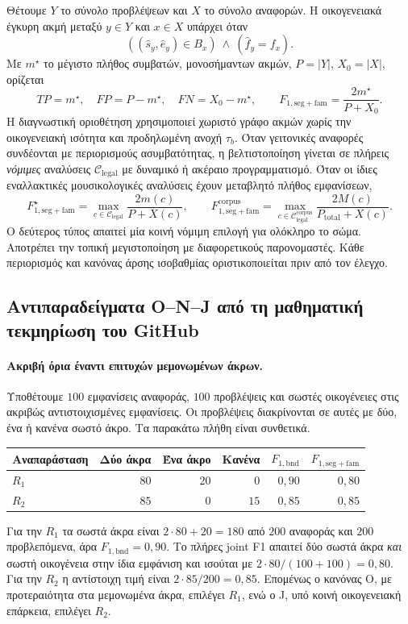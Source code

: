 \documentclass[11pt,a4paper]{article}
\begin{document}
Θέτουμε $Y$ το σύνολο προβλέψεων και $X$ το σύνολο αναφορών. Η οικογενειακά έγκυρη ακμή μεταξύ $y\in Y$ και $x\in X$ υπάρχει όταν
\[
 ((\hat s_y,\hat e_y)\in B_x)\ \land\ (\hat f_y=f_x).
\]
Με $m^\star$ το μέγιστο πλήθος συμβατών, μονοσήμαντων ακμών, $P=|Y|$, $X_0=|X|$, ορίζεται
\[
 TP=m^\star,\quad FP=P-m^\star,\quad FN=X_0-m^\star,
 \qquad F_{1,\mathrm{seg+fam}}=\frac{2m^\star}{P+X_0}.
\]
Η διαγνωστική οριοθέτηση χρησιμοποιεί χωριστό γράφο ακμών χωρίς την οικογενειακή ισότητα και προδηλωμένη ανοχή $\tau_b$. Όταν γειτονικές αναφορές συνδέονται με περιορισμούς ασυμβατότητας, η βελτιστοποίηση γίνεται σε πλήρεις \emph{νόμιμες} αναλύσεις $\mathcal C_{\mathrm{legal}}$ με δυναμικό ή ακέραιο προγραμματισμό. Όταν οι ίδιες εναλλακτικές μουσικολογικές αναλύσεις έχουν μεταβλητό πλήθος εμφανίσεων,
\[
 F^{\star}_{1,\mathrm{seg+fam}}
 =\max_{c\in\mathcal C_{\mathrm{legal}}}\frac{2m(c)}{P+X(c)},
 \qquad
 F^{\mathrm{corpus}}_{1,\mathrm{seg+fam}}
 =\max_{c\in\mathcal C^{\mathrm{corpus}}_{\mathrm{legal}}}
 \frac{2M(c)}{P_{\mathrm{total}}+X(c)}.
\]
Ο δεύτερος τύπος απαιτεί μία κοινή νόμιμη επιλογή για ολόκληρο το σώμα. Αποτρέπει την τοπική μεγιστοποίηση με διαφορετικούς παρονομαστές. Κάθε περιορισμός και κανόνας άρσης ισοβαθμίας οριστικοποιείται πριν από τον έλεγχο.

\subsection{Αντιπαραδείγματα O--N--J από τη μαθηματική τεκμηρίωση του GitHub}
\paragraph{Ακριβή όρια έναντι επιτυχών μεμονωμένων άκρων.}
Υποθέτουμε $100$ εμφανίσεις αναφοράς, $100$ προβλέψεις και σωστές οικογένειες στις ακριβώς αντιστοιχισμένες εμφανίσεις. Οι προβλέψεις διακρίνονται σε αυτές με δύο, ένα ή κανένα σωστό άκρο. Τα παρακάτω πλήθη είναι συνθετικά.
\begin{center}\small
\begin{tabular}{@{}lrrrrr@{}}
\toprule
Αναπαράσταση & Δύο άκρα & Ένα άκρο & Κανένα & $F_{1,\mathrm{bnd}}$ & $F_{1,\mathrm{seg+fam}}$\\
\midrule
$R_1$ & $80$ & $20$ & $0$ & $0{,}90$ & $0{,}80$\\
$R_2$ & $85$ & $0$ & $15$ & $0{,}85$ & $0{,}85$\\
\bottomrule
\end{tabular}
\end{center}
Για την $R_1$ τα σωστά άκρα είναι $2\cdot80+20=180$ από $200$ αναφοράς και $200$ προβλεπόμενα, άρα $F_{1,\mathrm{bnd}}=0{,}90$. Το πλήρες joint F1 απαιτεί δύο σωστά άκρα \emph{και} σωστή οικογένεια στην ίδια εμφάνιση και ισούται με $2\cdot80/(100+100)=0{,}80$. Για την $R_2$ η αντίστοιχη τιμή είναι $2\cdot85/200=0{,}85$. Επομένως ο κανόνας O, με προτεραιότητα στα μεμονωμένα άκρα, επιλέγει $R_1$, ενώ ο J, υπό κοινή οικογενειακή επάρκεια, επιλέγει $R_2$.
\end{document}
